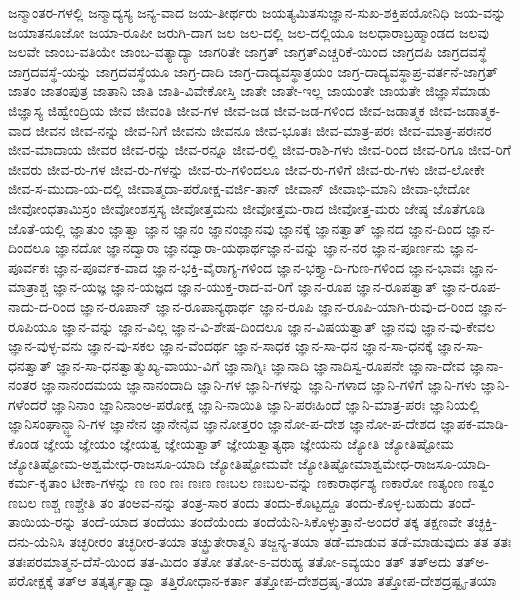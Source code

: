 {ಜನ್ಮಾಂತರ-ಗಳಲ್ಲಿ
ಜನ್ಮಾದ್ಯಸ್ಯ
ಜನ್ಯ-ವಾದ
ಜಯ-ತೀರ್ಥರು
ಜಯತ್ಯಮಿತಸುಜ್ಞಾನ-ಸುಖ-ಶಕ್ತಿಪಯೋನಿಧಿ
ಜಯ-ವನ್ನು
ಜಯಾತನೂಜೋ
ಜಯಾ-ರೂಪೀ
ಜರುಗಿ-ದಾಗ
ಜಲ
ಜಲ-ದಲ್ಲಿ
ಜಲ-ದಲ್ಲಿಯೂ
ಜಲಧಾರಾಬ್ರಹ್ಮಾಂಡದ
ಜಲವು
ಜಲವೇ
ಜಾಂಬ-ವತಿಯೇ
ಜಾಂಬ-ವತ್ಯಾದ್ಯಾ
ಜಾಗರಿತೇ
ಜಾಗ್ರತ್
ಜಾಗ್ರತ್ಎಚ್ಚರಿಕೆ-ಯಿಂದ
ಜಾಗ್ರದಪಿ
ಜಾಗ್ರದವಸ್ಥೆ
ಜಾಗ್ರದವಸ್ಥೆ-ಯನ್ನು
ಜಾಗ್ರದವಸ್ಥೆಯೂ
ಜಾಗ್ರ-ದಾದಿ
ಜಾಗ್ರ-ದಾದ್ಯವಸ್ಥಾತ್ರಯಂ
ಜಾಗ್ರ-ದಾದ್ಯವಸ್ಥಾಪ್ರ-ವರ್ತನೆ-ಜಾಗ್ರತ್
ಜಾತಂ
ಜಾತಂಪುತ್ರ
ಜಾತಾನಿ
ಜಾತಿ
ಜಾತಿ-ವಿವೇಕೋಸ್ತಿ
ಜಾತೇ
ಜಾತೇ-ಇಲ್ಲ
ಜಾಯಂತೇ
ಜಾಯತೇ
ಜಿಜ್ಞಾಸೆಮಾಡು
ಜಿಜ್ಞಾಸ್ಯ
ಜಿಹ್ವೇಂದ್ರಿಯ
ಜೀವ
ಜೀವಂತಿ
ಜೀವ-ಗಳ
ಜೀವ-ಜಡ
ಜೀವ-ಜಡ-ಗಳಿಂದ
ಜೀವ-ಜಡಾತ್ಮಕ
ಜೀವ-ಜಡಾತ್ಮಕ-ವಾದ
ಜೀವನ
ಜೀವ-ನನ್ನು
ಜೀವ-ನಿಗೆ
ಜೀವನು
ಜೀವನೂ
ಜೀವ-ಭೂತಃ
ಜೀವ-ಮಾತ್ರ-ಪರಃ
ಜೀವ-ಮಾತ್ರ-ಪರಃನರ
ಜೀವ-ಮಾದಾಯ
ಜೀವರ
ಜೀವ-ರನ್ನು
ಜೀವ-ರನ್ನೂ
ಜೀವ-ರಲ್ಲಿ
ಜೀವ-ರಾಶಿ-ಗಳು
ಜೀವ-ರಿಂದ
ಜೀವ-ರಿಗೂ
ಜೀವ-ರಿಗೆ
ಜೀವರು
ಜೀವ-ರು-ಗಳ
ಜೀವ-ರು-ಗಳನ್ನು
ಜೀವ-ರು-ಗಳಿಂದಲೂ
ಜೀವ-ರು-ಗಳಿಗೆ
ಜೀವ-ರು-ಗಳು
ಜೀವ-ಲೋಕೇ
ಜೀವ-ಸ-ಮುದಾ-ಯ-ದಲ್ಲಿ
ಜೀವಾತ್ಮದಾ-ಪರೋಕ್ಷ-ವರ್ಜಿ-ತಾನ್
ಜೀವಾನ್
ಜೀವಾಭಿ-ಮಾನಿ
ಜೀವಾ-ಭೇದೋ
ಜೀವೋಂಧತಾಮಿಸ್ರಂ
ಜೀವೋಂಶಸ್ತಸ್ಯ
ಜೀವೋತ್ತಮನು
ಜೀವೋತ್ತಮ-ರಾದ
ಜೀವೋತ್ತ-ಮರು
ಜೇಷ್ಠ
ಜೊತೆಗೂಡಿ
ಜೊತೆ-ಯಲ್ಲಿ
ಜ್ಞಾತುಂ
ಜ್ಞಾತ್ವಾ
ಜ್ಞಾನ
ಜ್ಞಾನಂ
ಜ್ಞಾನಂಜ್ಞಾನವು
ಜ್ಞಾನಕ್ಕೆ
ಜ್ಞಾನತ್ವಾತ್
ಜ್ಞಾನದ
ಜ್ಞಾನ-ದಿಂದ
ಜ್ಞಾನ-ದಿಂದಲೂ
ಜ್ಞಾನದೋ
ಜ್ಞಾನದ್ವಾರಾ
ಜ್ಞಾನದ್ವಾರಾ-ಯಥಾರ್ಥಜ್ಞಾನ-ವನ್ನು
ಜ್ಞಾನ-ನರ
ಜ್ಞಾನ-ಪೂರ್ಣನು
ಜ್ಞಾನ-ಪೂರ್ವಕಃ
ಜ್ಞಾನ-ಪೂರ್ವಕ-ವಾದ
ಜ್ಞಾನ-ಭಕ್ತಿ-ವೈರಾಗ್ಯ-ಗಳಿಂದ
ಜ್ಞಾನ-ಭಕ್ತ್ಯಾ-ದಿ-ಗುಣ-ಗಳಿಂದ
ಜ್ಞಾನ-ಭಾವಃ
ಜ್ಞಾನ-ಮಾತ್ರಾಶ್ಚ
ಜ್ಞಾನ-ಯಜ್ಞ
ಜ್ಞಾನ-ಯಜ್ಞದ
ಜ್ಞಾನ-ಯುಕ್ತ-ರಾದ-ವ-ರಿಗೆ
ಜ್ಞಾನ-ರೂಪ
ಜ್ಞಾನ-ರೂಪತ್ವಾತ್
ಜ್ಞಾನ-ರೂಪ-ನಾದು-ದ-ರಿಂದ
ಜ್ಞಾನ-ರೂಪಾನ್
ಜ್ಞಾನ-ರೂಪಾನ್ಯಥಾರ್ಥ
ಜ್ಞಾನ-ರೂಪಿ
ಜ್ಞಾನ-ರೂಪಿ-ಯಾಗಿ-ರುವು-ದ-ರಿಂದ
ಜ್ಞಾನ-ರೂಪಿಯೂ
ಜ್ಞಾನ-ವನ್ನು
ಜ್ಞಾನ-ವಿಲ್ಲ
ಜ್ಞಾನ-ವಿ-ಶೇಷ-ದಿಂದಲೂ
ಜ್ಞಾನ-ವಿಷಯತ್ವಾತ್
ಜ್ಞಾನವು
ಜ್ಞಾನ-ವು-ಕೇವಲ
ಜ್ಞಾನ-ವುಳ್ಳ-ವನು
ಜ್ಞಾನ-ವು-ಸಕಲ
ಜ್ಞಾನ-ವೆಂದರ್ಥ
ಜ್ಞಾನ-ಸಾಧಕ
ಜ್ಞಾನ-ಸಾ-ಧನ
ಜ್ಞಾನ-ಸಾ-ಧನಕ್ಕೆ
ಜ್ಞಾನ-ಸಾ-ಧನತ್ವಾತ್
ಜ್ಞಾನ-ಸಾ-ಧನತ್ವಾತ್ಮುಖ್ಯ-ವಾಯು-ವಿಗೆ
ಜ್ಞಾನಾಗ್ನಿಃ
ಜ್ಞಾನಾದಿ
ಜ್ಞಾನಾದಿಸ್ವ-ರೂಪನೇ
ಜ್ಞಾನಾ-ದೇವ
ಜ್ಞಾನಾ-ನಂತರ
ಜ್ಞಾನಾನಂದಮಯ
ಜ್ಞಾನಾನಂದಾದಿ
ಜ್ಞಾನಿ-ಗಳ
ಜ್ಞಾನಿ-ಗಳನ್ನು
ಜ್ಞಾನಿ-ಗಳಾದ
ಜ್ಞಾನಿ-ಗಳಿಗೆ
ಜ್ಞಾನಿ-ಗಳು
ಜ್ಞಾನಿ-ಗಳೆಂದರೆ
ಜ್ಞಾನಿನಾಂ
ಜ್ಞಾನಿನಾಂಅ-ಪರೋಕ್ಷ
ಜ್ಞಾನಿ-ನಾಯಿತಿ
ಜ್ಞಾನಿ-ಪರಃಹಿಂದೆ
ಜ್ಞಾನಿ-ಮಾತ್ರ-ಪರಃ
ಜ್ಞಾನಿಯಲ್ಲಿ
ಜ್ಞಾನಿಸಂಘಾನ್ಜ್ಞಾನಿ-ಗಳ
ಜ್ಞಾನೇನ
ಜ್ಞಾನೇನೈವ
ಜ್ಞಾನೋತ್ತರಂ
ಜ್ಞಾನೋ-ಪ-ದೇಶ
ಜ್ಞಾನೋ-ಪ-ದೇಶದ
ಜ್ಞಾಪಕ-ಮಾಡಿ-ಕೊಂಡ
ಜ್ಞೇಯ
ಜ್ಞೇಯಂ
ಜ್ಞೇಯತ್ವ
ಜ್ಞೇಯತ್ವಾತ್
ಜ್ಞೇಯತ್ವಾತ್ಯಥಾ
ಜ್ಞೇಯನು
ಜ್ಯೋತಿ
ಜ್ಯೋತಿಷ್ಟೋಮ
ಜ್ಯೋತಿಷ್ಟೋಮ-ಅಶ್ವಮೇಧ-ರಾಜಸೂ-ಯಾದಿ
ಜ್ಯೋತಿಷ್ಟೋಮವೇ
ಜ್ಯೋತಿಷ್ಟೋಮಾಶ್ವಮೇಧ-ರಾಜಸೂ-ಯಾದಿ-ಕರ್ಮ-ಕೃತಾಂ
ಟೀಕಾ-ಗಳನ್ನು
ಣ
ಣಂ
ಣಃ
ಣಃಣ
ಣಃಬಲ
ಣಃಬಲ-ವನ್ನು
ಣಕಾರಾರ್ಥಶ್ಯ
ಣಕಾರೋ
ಣತ್ಯಂಣ
ಣತ್ವಂ
ಣಬಲ
ಣಶ್ಚ
ಣಶ್ಚೇತಿ
ತಂ
ತಂಅವ-ನನ್ನು
ತಂತ್ರ-ಸಾರ
ತಂದು
ತಂದು-ಕೊಟ್ಟದ್ದೂ
ತಂದು-ಕೊಳ್ಳ-ಬಹುದು
ತಂದೆ-ತಾಯಿಯ-ರನ್ನು
ತಂದೆ-ಯಾದ
ತಂದೆಯು
ತಂದೆಯೆಂದು
ತಂದೆಯೆನಿ-ಸಿಕೊಳ್ಳುತ್ತಾನೆ-ಅಂದರೆ
ತಕ್ಕ
ತಕ್ಷಣವೇ
ತಚ್ಛಕ್ತಿ-ದನು-ಯೆನಿಸಿ
ತಚ್ಛರೀರಂ
ತಚ್ಛರೀರ-ತಯಾ
ತಚ್ಛ್ರುತೇರಾತ್ಮನಿ
ತಜ್ಜನ್ಯ-ತಯಾ
ತಡೆ-ಮಾಡುವ
ತಡೆ-ಮಾಡುವುದು
ತತ
ತತಃ
ತತಃಪರಮಾತ್ಮನ-ದೆಸೆ-ಯಿಂದ
ತತ-ಮಿದಂ
ತತೋ
ತತೋ-ಽ-ವರುಹ್ಯ
ತತೋ-ಽವ್ಯಯಂ
ತತ್
ತತ್ಅದು
ತತ್ಅ-ಪರೋಕ್ಷಕ್ಕೆ
ತತ್ಆ
ತತ್ಕರ್ತೃತ್ವಾದ್ವಾ
ತತ್ತಿರೋಧಾನ-ಕರ್ತಾ
ತತ್ತೋಪ-ದೇಶದ್ರಷೃ-ತಯಾ
ತತ್ತೋಪ-ದೇಶದ್ರಷ್ಟೃ-ತಯಾ
}
